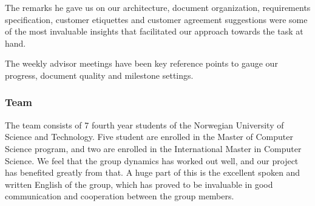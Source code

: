 The remarks he gave us on our architecture, document organization, requirements specification, customer etiquettes and customer agreement suggestions were some of the most invaluable insights that facilitated our approach towards the task at hand.

The weekly advisor meetings have been key reference points to gauge our progress, document quality and milestone settings.
	\subsubsection{Team}
  The team consists of 7 fourth year students of the Norwegian University of Science and Technology. Five student are enrolled in the Master of Computer Science program, and two are enrolled in the International Master in Computer Science. We feel that the group dynamics has worked out well, and our project has benefited greatly from that. A huge part of this is the excellent spoken and written English of the group, which has proved to be invaluable in good communication and cooperation between the group members.




